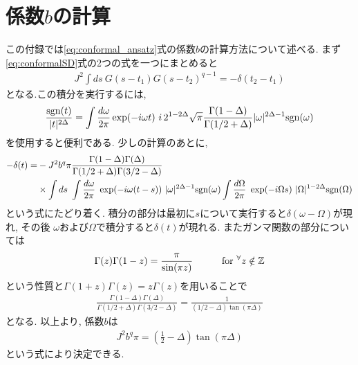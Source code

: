 \section{係数$b$の計算 \label{app:b}}
	
	この付録では\eqref{eq:conformal_ansatz}式の係数$b$の計算方法について述べる.
	まず\eqref{eq:conformalSD}式の2つの式を一つにまとめると
	\begin{align}
		J^2\int ds\ G(s - t_1)G(s - t_2)^{q - 1} = -\delta(t_2 - t_1)
		\label{eq:intOfGG}
	\end{align}
	となる.この積分を実行するには, 
	\begin{align}
	\frac{\sgn(t)}{|t|^{2\Delta}} = 
		\int \frac{d\omega}{2\pi}\exp(-i\omega t)\ 
		i\, 2^{1 - 2\Delta}\sqrt{\pi}\frac{\Gamma(1 - \Delta)}{\Gamma(1/2 + \Delta)}
		|\omega|^{2\Delta - 1}\sgn(\omega)
	\end{align}
	を使用すると便利である.
	少しの計算のあとに, 
	\begin{align}
	-\delta(t) = &-J^2b^q\pi
		\frac{\Gamma(1 - \Delta)\Gamma(\Delta)}{\Gamma(1/2 + \Delta)\Gamma(3/2 - \Delta)}
		\nonumber\\
		&\times \int ds\ 
		\int \frac{d\omega}{2\pi}\ \exp(-i\omega(t - s))\ |\omega|^{2\Delta - 1}\sgn(\omega)
		\int \frac{d\Omega}{2\pi}\ \exp(-i\Omega s)\ |\Omega|^{1 - 2\Delta}\sgn(\Omega)
	\end{align}
	という式にたどり着く. 
	積分の部分は最初に$s$について実行すると$\delta(\omega - \Omega)$が現れ, その後
	$\omega$および$\Omega$で積分すると$\delta(t)$が現れる. 
	またガンマ関数の部分については
	\begin{align}
	\Gamma(z)\Gamma(1 - z) = \frac{\pi}{\sin(\pi z)}
	\hspace{30pt}
	{\rm for}\ {}^{\forall}z \notin \mathbb{Z}
	\end{align}
	という性質と$\Gamma(1 + z)\Gamma(z) = z\Gamma(z)$を用いることで
	\begin{align}
	\frac{\Gamma(1 - \Delta)\Gamma(\Delta)}{\Gamma(1/2 + \Delta)\Gamma(3/2 - \Delta)}
	= \frac{1}{(1/2 - \Delta) \tan(\pi\Delta)}
	\end{align}
	となる. 以上より, 係数$b$は
	\begin{align}
		J^2b^q\pi = \left(\frac{1}{2} - \Delta\right)\tan(\pi\Delta)
	\end{align}
	という式により決定できる. 
	
	\pagebreak